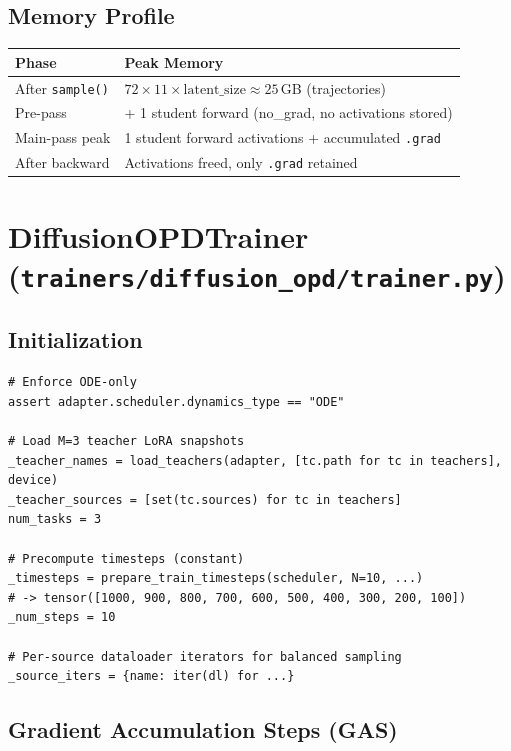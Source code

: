 \documentclass[11pt]{article}
\begin{document}
\subsection{Memory Profile}

\begin{table}[h]
\centering
\begin{tabular}{ll}
\toprule
Phase & Peak Memory \\
\midrule
After \texttt{sample()} & $72 \times 11 \times \text{latent\_size} \approx 25$\,GB (trajectories) \\
Pre-pass & + 1 student forward (no\_grad, no activations stored) \\
Main-pass peak & 1 student forward activations + accumulated \texttt{.grad} \\
After backward & Activations freed, only \texttt{.grad} retained \\
\bottomrule
\end{tabular}
\end{table}

\section{DiffusionOPDTrainer (\texttt{trainers/diffusion\_opd/trainer.py})}

\subsection{Initialization}

\begin{lstlisting}
# Enforce ODE-only
assert adapter.scheduler.dynamics_type == "ODE"

# Load M=3 teacher LoRA snapshots
_teacher_names = load_teachers(adapter, [tc.path for tc in teachers], device)
_teacher_sources = [set(tc.sources) for tc in teachers]
num_tasks = 3

# Precompute timesteps (constant)
_timesteps = prepare_train_timesteps(scheduler, N=10, ...)
# -> tensor([1000, 900, 800, 700, 600, 500, 400, 300, 200, 100])
_num_steps = 10

# Per-source dataloader iterators for balanced sampling
_source_iters = {name: iter(dl) for ...}
\end{lstlisting}

\subsection{Gradient Accumulation Steps (GAS)}
\end{document}
